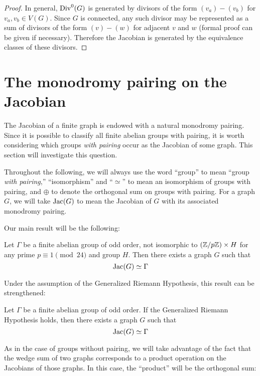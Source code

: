 \documentclass{amsart}
\begin{document}
\begin{proof}
  In general, $\operatorname{Div}^0(G)$ is generated by divisors of the form $(v_a)
  - (v_b)$ for $v_a, v_b \in V(G)$. Since $G$ is connected, any such
  divisor may be represented as a sum of divisors of the form $(v) -
  (w)$ for adjacent $v$ and $w$ (formal proof can be given if
  necessary). Therefore the Jacobian is generated by the equivalence
  classes of these divisors.  
\end{proof}

\section{The monodromy pairing on the Jacobian}

The Jacobian of a finite graph is endowed with a natural monodromy
pairing. Since it is possible to classify all finite abelian groups
with pairing, it is worth considering which groups \emph{with pairing}
occur as the Jacobian of some graph. This section will investigate
this question.

\begin{note}
  Throughout the following, we will always use the word ``group'' to
  mean ``group \emph{with pairing},'' ``isomorphism'' and ``$\simeq$''
  to mean an isomorphism of groups with pairing, and $\oplus$ to
  denote the orthogonal sum on groups with pairing. For a graph $G$,
  we will take $\operatorname{Jac}(G)$ to mean the Jacobian of $G$ with its
  associated monodromy pairing.
\end{note}

Our main result will be the following:

\begin{thm}
  Let $\Gamma$ be a finite abelian group of odd order, not isomorphic
  to $(\mathbb{Z}/p\mathbb{Z}) \times H$ for any prime $p \equiv 1 \pmod {24}$ and
  group $H$. Then there exists a graph $G$ such that
  \[
  \operatorname{Jac}(G) \simeq \Gamma
  \]
\end{thm}

Under the assumption of the Generalized Riemann Hypothesis, this
result can be strengthened:
\begin{thm}
  Let $\Gamma$ be a finite abelian group of odd order. If the
  Generalized Riemann Hypothesis holds, then there exists a graph $G$
  such that 
  \[
  \operatorname{Jac}(G) \simeq \Gamma
  \]
\end{thm}

As in the case of groups without pairing, we will take advantage of
the fact that the wedge sum of two graphs corresponds to a product
operation on the Jacobians of those graphs. In this case, the
``product'' will be the orthogonal sum:
\end{document}
